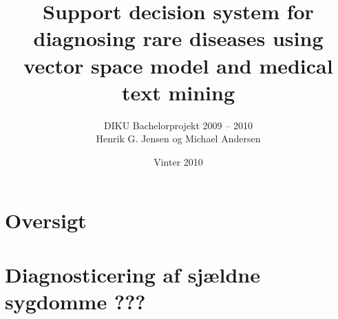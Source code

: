 \documentclass[xcolor=table]{beamer}
\title{ \textbf{Support decision system for diagnosing rare diseases using vector space model and medical text mining}}
\subtitle{{\footnotesize DIKU Bachelorprojekt 2009 -- 2010}\\{\tiny Henrik G. Jensen og Michael Andersen}}
\date{Vinter 2010}
\begin{document}
\begin{frame}
    \titlepage
\end{frame}

\section{Oversigt}





\section{Diagnosticering af sjældne sygdomme ???}

\subsection*{}
\end{document}
